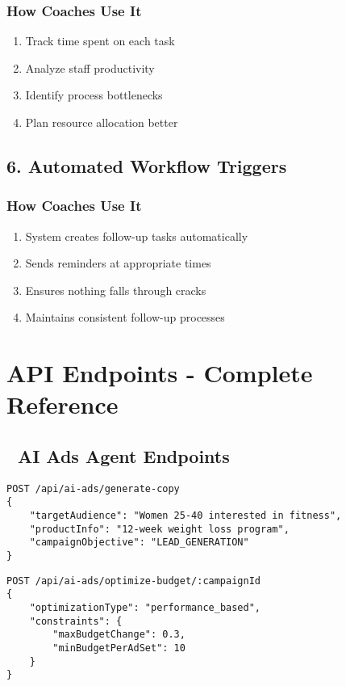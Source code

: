 \documentclass[12pt,a4paper]{article}
\begin{document}
\subsubsection{How Coaches Use It}
\begin{enumerate}
    \item Track time spent on each task
    \item Analyze staff productivity
    \item Identify process bottlenecks
    \item Plan resource allocation better
\end{enumerate}

\subsection{6. Automated Workflow Triggers}

\subsubsection{How Coaches Use It}
\begin{enumerate}
    \item System creates follow-up tasks automatically
    \item Sends reminders at appropriate times
    \item Ensures nothing falls through cracks
    \item Maintains consistent follow-up processes
\end{enumerate}

\section{API Endpoints - Complete Reference}

\subsection{🤖 AI Ads Agent Endpoints}

\begin{lstlisting}[caption=Generate AI Ad Copy]
POST /api/ai-ads/generate-copy
{
    "targetAudience": "Women 25-40 interested in fitness",
    "productInfo": "12-week weight loss program",
    "campaignObjective": "LEAD_GENERATION"
}
\end{lstlisting}

\begin{lstlisting}[caption=Optimize Campaign Budget]
POST /api/ai-ads/optimize-budget/:campaignId
{
    "optimizationType": "performance_based",
    "constraints": {
        "maxBudgetChange": 0.3,
        "minBudgetPerAdSet": 10
    }
}
\end{lstlisting}
\end{document}

